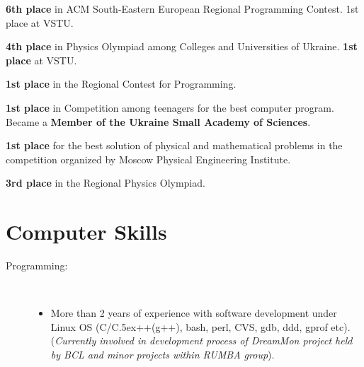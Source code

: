 \documentclass[10pt,overlapped,line]{res}
\def\Cplusplus{{\rm C\raise.5ex\hbox{\small ++}}}
\newcommand{\mplace}[1]{\textbf{#1}}
\newcommand{\wdescription}[1]{({\small \textit{#1}})}
\begin{document}
\begin{resume}
 \begin{position}
   \mplace{6th place} in ACM South-Eastern European Regional
   Programming Contest. 1st place at VSTU.
 \end{position}

 \begin{position}
   \mplace{4th place} in Physics Olympiad among Colleges and
   Universities of Ukraine. \mplace{1st place} at VSTU.
 \end{position}

 \begin{position}
 \mplace{1st place} in the Regional Contest for Programming.
 \end{position}

 \begin{position}
   \mplace{1st place} in Competition among teenagers for the best
   computer program. Became a \mplace{Member of the Ukraine Small Academy
     of Sciences}.
 \end{position}

 \begin{position}
   \mplace{1st place} for the best solution of physical and mathematical
   problems in the competition organized by Moscow Physical Engineering Institute.
 \end{position}

 \begin{position}
   \mplace{3rd place} in the Regional Physics Olympiad.

 \end{position}

 \section{Computer Skills}
  \begin{description}
    \item[Programming:] \hspace*{\fill} \\
      \begin{itemize}
      \item More than 2 years of experience with software development
        under Linux OS (C/\Cplusplus(g++), bash, perl, CVS, gdb, ddd,
        gprof etc).  \wdescription{Currently involved in development
          process of DreamMon project held by BCL and minor projects within
          RUMBA group}.


\end{itemize}
\end{description}
\end{resume}
\end{document}
